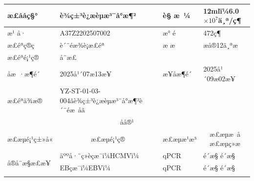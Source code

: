 \documentclass[UTF8,10pt,a4paper,fontset=fandol]{ctexart}
\newcommand{\fieldvalue}[1]{#1}
\begin{document}
\begin{tabularx}{\textwidth}{|p{2.2cm}|X|p{2.0cm}|X|}
\hline
æ£ååç§° &
\fieldvalue{è¾ç±³è¿æèµæ³¨å°æ¶²} &
è§ æ ¼ &
\fieldvalue{12mlï¼6.0$\times 10^{7}$ä¸ª/ç¶}
\\ \hline
æ¹ å· &
\fieldvalue{A37Z2202507002} &
æ° é &
\fieldvalue{472ç¶}
\\ \hline
æ£éªç®ç &
\fieldvalue{è´¨éæ¾è¡æ£éª} &
æ æ &
\fieldvalue{æå®12ä¸ªæ}
\\ \hline
æ£éªé¡¹ç® &
\fieldvalue{å¨æ£} &
\multicolumn{2}{l|}{}
\\ \hline
åæ ·æ¶é´ &
\fieldvalue{2025å¹´07æ13æ¥} &
æ¥åæ¶é´ &
\fieldvalue{2025å¹´09æ02æ¥}
\\ \hline
æ£éªä¾æ® &
\fieldvalue{YZ-ST-01-03-004ãè¾ç±³è¿æèµæ³¨å°æ¶²è´¨éæ åã}
& \multicolumn{2}{l|}{}
\\ \hline
\multicolumn{4}{c}{å\quad å®¹}
\\ \hline
\multicolumn{1}{|c|}{æ£æµé¡¹ç±»å«} &
\multicolumn{1}{c|}{æ£æµé¡¹ç®} &
\multicolumn{1}{c|}{æ£æµæ¹æ³} &
\multicolumn{1}{c|}{æ£æµæ å \quad æ£æµç»æ}
\\ \hline
\multirow{11}{*}{å®å¨æ§æ£æ¥}
&
\fieldvalue{äººå·¨ç»èçæ¯ï¼HCMVï¼}
&
\fieldvalue{qPCR}
&
\fieldvalue{é´æ§}
\quad
\fieldvalue{é´æ§}
\\ \cline{2-4}
&
\fieldvalue{EBçæ¯ï¼EBVï¼}
&
\fieldvalue{qPCR}
&
\fieldvalue{é´æ§}
\quad
\fieldvalue{é´æ§}
\\ \cline{2-4}

\end{tabularx}
\end{document}
